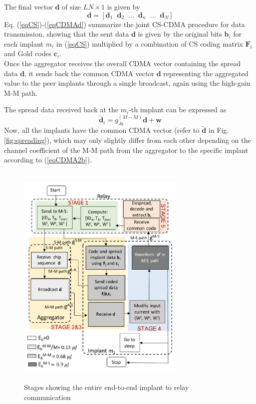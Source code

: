 The final vector $\mathbf{d}$ of size $LN \times 1$ is given by
\begin{equation}
	\mathbf{d} = [\mathbf{d}_1 \phantom{x} \mathbf{d}_2 \phantom{x} ... \phantom{x} \mathbf{d}_n \phantom{x} ... \phantom{x} \mathbf{d}_N] 
	\label{eqCDMAd}
	\end{equation}
Eq. (\ref{eqCS})-(\ref{eqCDMAd}) summarize the joint CS-CDMA procedure for data transmission, showing that the sent data $\mathbf{d}$ is given by the original bits $\mathbf{b}_i$ for each implant $m_i$ in (\ref{eqCS}) multiplied by a combination of CS coding matrix $\mathbf{F}_i$ and Gold codes $\mathbf{c}_i$.\\
 
Once the aggregator receives the overall CDMA vector containing the spread data $\mathbf{d}$, it sends back the common CDMA vector $\mathbf{d}$ representing the aggregated value to the peer implants through a single broadcast, again using the high-gain M-M path. 

The spread data received back at the $m_i$-th implant can be expressed as
\begin{equation}
\tilde{\mathbf{d}}_i=g_{Ai}^{(M-M)}\mathbf{d} + \mathbf{w}
\label{eqCDMA2b}
\end{equation}
Now, all the implants have the common CDMA vector (refer to $\tilde{\mathbf{d}}$ in Fig. \ref{fig:spreading}), which may only slightly differ from each other depending on the channel coefficient of the M-M path from the aggregator to the specific implant according to (\ref{eqCDMA2b}).
  
\begin{figure}
 \centering
\includegraphics[width=8cm,height=11cm]{figures/GC_beamforming/diagram.pdf}  
\vspace{-2mm} 
 \caption{\label{fig:flowchart} Stages showing the entire end-to-end implant to relay communication}
 \vspace{-6mm}
\end{figure}
   
